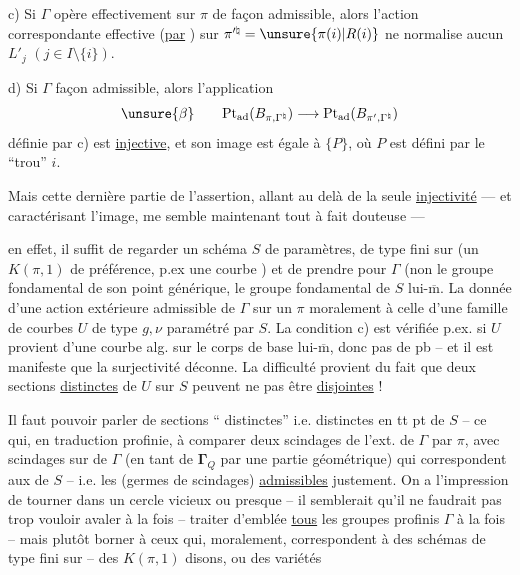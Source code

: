 c) Si $\Gamma$ opère effectivement sur $\pi$ de façon admissible,  alors l'action correspondante effective (\uline{par} ) sur $\pi^{\prime\natural}=\unsure{\pi(i)|R(i)}$ ne normalise aucun $L'_j$ $(j\in I\setminus\{i\})$.

d) Si $\Gamma$  façon admissible, alors l'application
\[
\unsure{\beta}\qquad
\mathrm{Pt}_{\mathrm{ad}}(B_{\pi,\Gamma^{\natural}})\longrightarrow
\mathrm{Pt}_{\mathrm{ad}}(B_{\pi',\Gamma^{\natural}})
\]
définie par c) est \uline{injective}, et  son image est  égale à $\{P\}$, où $P$ est défini par le ``trou'' $i$.

Mais cette dernière partie de l'assertion, allant au delà de la seule \uline{injectivité} --- et caractérisant l'image, me semble maintenant tout à fait douteuse ---

en effet, il suffit de regarder un schéma $S$ de paramètres, de type fini sur  (un $K(\pi,1)$ de préférence, p.ex une courbe ) et de prendre pour $\Gamma$ (non le groupe fondamental de son point générique,   le groupe fondamental de $S$ lui-$\overline{\mathrm m}$. La donnée d'une action extérieure admissible de $\Gamma$ sur un $\pi$  moralement à celle d'une famille de courbes $U$ de type $g,\nu$ paramétré par $S$. La condition c) est vérifiée p.ex. si $U$ provient d'une courbe alg. sur le corps de base lui-$\overline{\mathrm m}$, donc pas de pb -- et il est manifeste que la surjectivité déconne. La difficulté provient du fait que deux sections \uline{distinctes} de $U$ sur $S$ peuvent ne pas être \uline{disjointes} !


Il faut pouvoir parler de sections `` distinctes'' i.e. distinctes en tt pt de $S$ -- ce qui, en traduction profinie,  à comparer deux scindages de l'ext. de $\Gamma$ par $\pi$, avec   scindages sur  de $\Gamma$ (en tant  de $\boldsymbol{\Gamma}_Q$ par une partie géométrique) qui correspondent aux  de $S$ -- i.e. les (germes de scindages) \uline{admissibles} justement. On a l'impression de tourner dans un cercle vicieux ou presque -- il semblerait qu'il ne faudrait pas trop vouloir avaler à la fois -- traiter d'emblée \uline{tous} les groupes profinis $\Gamma$ à la fois -- mais plutôt  borner  à ceux qui, moralement, correspondent à des  schémas de type fini sur  -- des $K(\pi,1)$ disons, ou  des variétés

